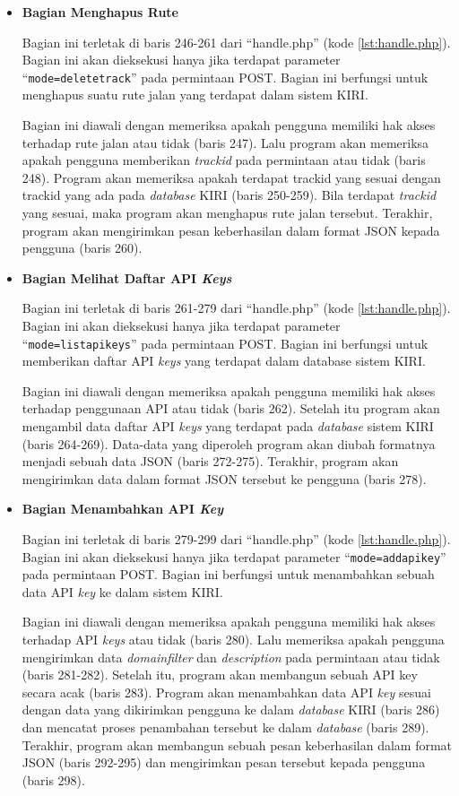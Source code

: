 \documentclass[a4paper,twoside]{article}
\begin{document}
\begin{enumerate}
\begin{itemize}
\item \textbf{Bagian Menghapus Rute}

Bagian ini terletak di baris 246-261 dari ``handle.php'' (kode \ref{lst:handle.php}). Bagian ini akan dieksekusi hanya jika terdapat parameter ``\texttt{mode=deletetrack}'' pada permintaan POST. Bagian ini berfungsi untuk menghapus suatu rute jalan yang terdapat dalam sistem KIRI.

Bagian ini diawali dengan memeriksa apakah pengguna memiliki hak akses terhadap rute jalan atau tidak (baris 247). Lalu program akan memeriksa apakah pengguna memberikan \textit{trackid} pada permintaan atau tidak (baris 248). Program akan memeriksa apakah terdapat {trackid} yang sesuai dengan {trackid} yang ada pada \textit{database} KIRI (baris 250-259). Bila terdapat \textit{trackid} yang sesuai, maka program akan menghapus rute jalan tersebut. Terakhir, program akan mengirimkan pesan keberhasilan dalam format JSON kepada pengguna (baris 260).

\item \textbf{Bagian Melihat Daftar API \textit{Keys}}

Bagian ini terletak di baris 261-279 dari ``handle.php'' (kode \ref{lst:handle.php}). Bagian ini akan dieksekusi hanya jika terdapat parameter ``\texttt{mode=listapikeys}'' pada permintaan POST. Bagian ini berfungsi untuk memberikan daftar API \textit{keys} yang terdapat dalam database sistem KIRI.

Bagian ini diawali dengan memeriksa apakah pengguna memiliki hak akses terhadap penggunaan API atau tidak (baris 262). Setelah itu program akan mengambil data daftar API \textit{keys} yang terdapat pada \textit{database} sistem KIRI (baris 264-269). Data-data yang diperoleh program akan diubah formatnya menjadi sebuah data JSON (baris 272-275). Terakhir, program akan mengirimkan data dalam format JSON tersebut ke pengguna (baris 278).

\item \textbf{Bagian Menambahkan API \textit{Key}}

Bagian ini terletak di baris 279-299 dari ``handle.php'' (kode \ref{lst:handle.php}). Bagian ini akan dieksekusi hanya jika terdapat parameter ``\texttt{mode=addapikey}'' pada permintaan POST. Bagian ini berfungsi untuk menambahkan sebuah data API \textit{key} ke dalam sistem KIRI.

Bagian ini diawali dengan memeriksa apakah pengguna memiliki hak akses terhadap API \textit{keys} atau tidak (baris 280). Lalu memeriksa apakah pengguna mengirimkan data \textit{domainfilter} dan \textit{description} pada permintaan atau tidak (baris 281-282). Setelah itu, program akan membangun sebuah API key secara acak (baris 283). Program akan menambahkan data API \textit{key} sesuai dengan data yang dikirimkan pengguna ke dalam \textit{database} KIRI (baris 286) dan mencatat proses penambahan tersebut ke dalam \textit{database} (baris 289). Terakhir, program akan membangun sebuah pesan keberhasilan dalam format JSON (baris 292-295) dan mengirimkan pesan tersebut kepada pengguna (baris 298).


\end{itemize}
\end{enumerate}
\end{document}
